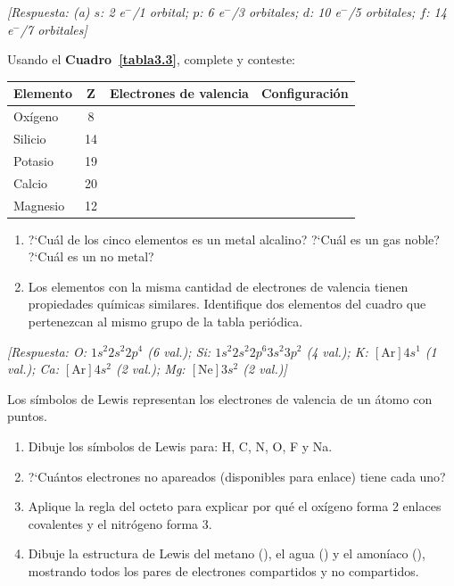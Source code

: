 \begin{bloque_ejercicios}
\begin{ejercicios}
\textit{[Respuesta: (a) $s$: 2 e$^-$/1 orbital;
$p$: 6 e$^-$/3 orbitales;
$d$: 10 e$^-$/5 orbitales;
$f$: 14 e$^-$/7 orbitales]}

\item Usando el \textbf{Cuadro~\ref{tabla3.3}}, complete y conteste:

{%
\centering
\begin{tabular}{lccl}
\toprule
\textbf{Elemento} & \textbf{Z} & \textbf{Electrones de valencia} &
\textbf{Configuraci\'on} \\
\midrule
Ox\'igeno   & 8  & & \\
Silicio     & 14 & & \\
Potasio     & 19 & & \\
Calcio      & 20 & & \\
Magnesio    & 12 & & \\
\bottomrule
\end{tabular}
\par
}%

\begin{enumerate}[label=\alph*)]
    \item ?`Cu\'al de los cinco elementos es un metal alcalino?
          ?`Cu\'al es un gas noble? ?`Cu\'al es un no metal?
    \item Los elementos con la misma cantidad de electrones de
          valencia tienen propiedades qu\'imicas similares.
          Identifique dos elementos del cuadro que pertenezcan
          al mismo grupo de la tabla peri\'odica.
\end{enumerate}

\textit{[Respuesta: O: $1s^2 2s^2 2p^4$ (6 val.);
Si: $1s^2 2s^2 2p^6 3s^2 3p^2$ (4 val.);
K: $[\text{Ar}]4s^1$ (1 val.);
Ca: $[\text{Ar}]4s^2$ (2 val.);
Mg: $[\text{Ne}]3s^2$ (2 val.)]}

\item Los s\'imbolos de Lewis representan los electrones de valencia
de un \'atomo con puntos.

\begin{enumerate}[label=\alph*)]
    \item Dibuje los s\'imbolos de Lewis para: H, C, N, O, F y Na.
    \item ?`Cu\'antos electrones no apareados (disponibles para enlace)
          tiene cada uno?
    \item Aplique la regla del octeto para explicar por qu\'e el
          ox\'igeno forma 2 enlaces covalentes y el nitr\'ogeno forma 3.
    \item Dibuje la estructura de Lewis del metano (),
          el agua () y el amon\'iaco (), mostrando
          todos los pares de electrones compartidos y no compartidos.
\end{enumerate}


\end{ejercicios}
\end{bloque_ejercicios}

